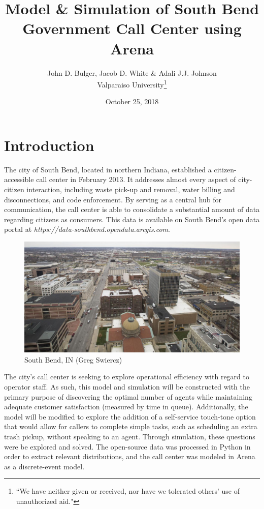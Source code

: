 \documentclass[12pt,twocolumn]{article}
\title{Model \& Simulation of South Bend Government Call Center using Arena}
\author{John D. Bulger, Jacob D. White \& Adali J.J. Johnson\\Valparaiso University\thanks{``We have neither given or received, nor have we tolerated others' use of unauthorized aid."}}
\date{October 25, 2018}
\begin{document}
\maketitle

\section{Introduction}
The city of South Bend, located in northern Indiana, established a citizen-accessible call center in February 2013.  It addresses almost every aspect of city-citizen interaction, including waste pick-up and removal, water billing and disconnections, and code enforcement.  By serving as a central hub for communication, the call center is able to consolidate a substantial amount of data regarding citizens as consumers.  This data is available on South Bend's open data portal at \textit{https://data-southbend.opendata.arcgis.com}.

	\begin{figure}[h]
	\includegraphics[scale=.17]{south_bend.png}
	\caption{South Bend, IN (Greg Swiercz)}
	\end{figure}

\par
The city's call center is seeking to explore operational efficiency with regard to operator staff.  As such, this model and simulation will be constructed with the primary purpose of discovering the optimal number of agents while maintaining adequate customer satisfaction (measured by time in queue).  Additionally, the model will be modified to explore the addition of a self-service touch-tone option that would allow for callers to complete simple tasks, such as scheduling an extra trash pickup, without speaking to an agent.  Through simulation, these questions were be explored and solved.  The open-source data was processed in Python in order to extract relevant distributions, and the call center was modeled in Arena as a discrete-event model.  
\end{document}
